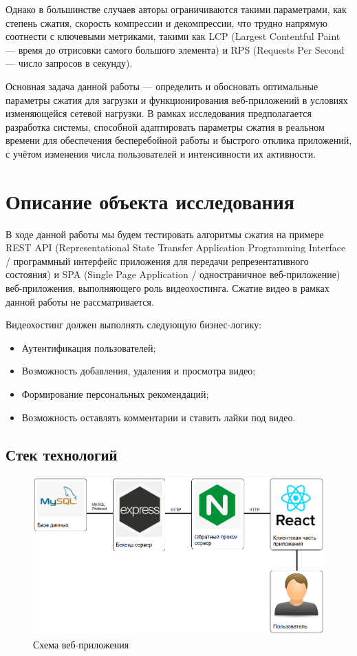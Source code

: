 \documentclass[12pt]{article}
\begin{document}
Однако в большинстве случаев авторы ограничиваются такими параметрами, как степень сжатия, скорость компрессии и декомпрессии,
что трудно напрямую соотнести с ключевыми метриками, такими как LCP (Largest Contentful Paint — время до отрисовки самого большого элемента)
и RPS (Requests Per Second — число запросов в секунду).

Основная задача данной работы — определить и обосновать оптимальные параметры сжатия для загрузки и функционирования
веб-приложений в условиях изменяющейся сетевой нагрузки. В рамках исследования предполагается разработка системы,
способной адаптировать параметры сжатия в реальном времени для обеспечения бесперебойной работы и быстрого отклика приложений,
с учётом изменения числа пользователей и интенсивности их активности.

\section{Описание объекта исследования}

В ходе данной работы мы будем тестировать алгоритмы сжатия на примере REST API
(Representational State Transfer Application Programming Interface / программный интерфейс приложения для передачи репрезентативного состояния)
и SPA (Single Page Application / одностраничное веб-приложение) веб-приложения, выполняющего роль видеохостинга.
Сжатие видео в рамках данной работы не рассматривается.

Видеохостинг должен выполнять следующую бизнес-логику:

\begin{itemize}
    \item Аутентификация пользователей;
    \item Возможность добавления, удаления и просмотра видео;
    \item Формирование персональных рекомендаций;
    \item Возможность оставлять комментарии и ставить лайки под видео.
\end{itemize}

\subsection{Стек технологий}

\begin{figure}[H]
    \centering
    \includegraphics[width=1\textwidth]{../images/Схема_веб-приложения.png}
    \caption{Схема веб-приложения}
\end{figure}
\end{document}
